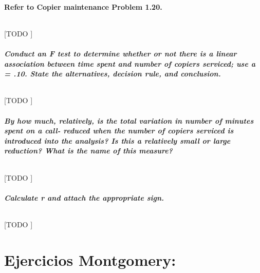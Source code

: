\documentclass{article}
\begin{document}
    \setcounter{subsection}{23}
    \subsection{Refer to \textbf{Copier maintenance} Problem 1.20.}


      \paragraph{}
      [TODO ]

      \setcounter{subsection}{1}
      \subsubsection{Conduct an F test to determine whether or not there is a linear association between time spent and number of copiers serviced; use a = .10. State the alternatives, decision rule, and conclusion.}

        \paragraph{}
        [TODO ]

      \subsubsection{By how much, relatively, is the total variation in number of minutes spent on a call- reduced when the number of copiers serviced is introduced into the analysis? Is this a relatively small or large reduction? What is the name of this measure?}

        \paragraph{}
        [TODO ]

      \subsubsection{Calculate r and attach the appropriate sign.}

        \paragraph{}
        [TODO ]


  \part{Ejercicios Montgomery:}
\end{document}
